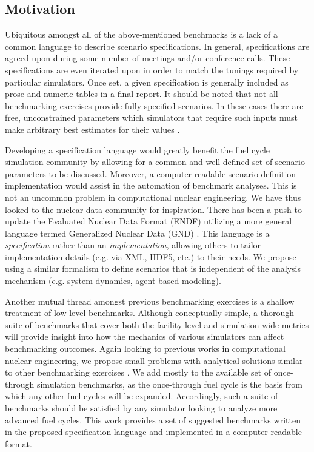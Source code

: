 \documentclass{anstrans}
\begin{document}
\subsection{Motivation}
Ubiquitous amongst all of the above-mentioned benchmarks is a lack of a common
language to describe scenario specifications. In general, specifications are
agreed upon during some number of meetings and/or conference calls. These 
specifications are even iterated upon in order to match the tunings required 
by particular simulators. Once set, a given specification is generally included 
as prose and numeric tables in a final report. It should be noted that not all 
benchmarking exercises provide fully specified scenarios. In these cases there 
are free, unconstrained parameters which simulators that require such inputs 
must make arbitrary best estimates for their values \cite{scopatz_fuel_2011}.

Developing a specification language would greatly benefit the fuel cycle
simulation community by allowing for a common and well-defined set of scenario
parameters to be discussed. Moreover, a computer-readable scenario definition
implementation would assist in the automation of benchmark analyses. This is not
an uncommon problem in computational nuclear engineering. We have thus looked to
the nuclear data community for inspiration.  There has been a push to update the
Evaluated Nuclear Data Format (ENDF) utilizing a more general language termed
Generalized Nuclear Data (GND) \cite{mattoon_generalized_2012}. This language is
a \emph{specification} rather than an \emph{implementation}, allowing others to
tailor implementation details (e.g. via XML, HDF5, etc.) to their needs. We
propose using a similar formalism to define scenarios that is independent of the
analysis mechanism (e.g. system dynamics, agent-based modeling).

Another mutual thread amongst previous benchmarking exercises is a shallow
treatment of low-level benchmarks. Although conceptually simple, a thorough
suite of benchmarks that cover both the facility-level and simulation-wide
metrics will provide insight into how the mechanics of various simulators can
affect benchmarking outcomes. Again looking to previous works in computational
nuclear engineering, we propose small problems with analytical solutions similar
to other benchmarking exercises \cite{wagner_mcnp:_1992}. We add mostly to the
available set of once-through simulation benchmarks, as the once-through fuel
cycle is the basis from which any other fuel cycles will be expanded.
Accordingly, such a suite of benchmarks should be satisfied by any simulator
looking to analyze more advanced fuel cycles. This work provides a set of
suggested benchmarks written in the proposed specification language and
implemented in a computer-readable format.
\end{document}
